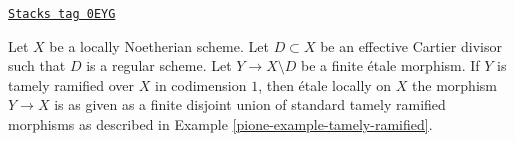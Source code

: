 \begin{lemma}

\label{pione-lemma-abhyankar-one-divisor}
\href{https://stacks.math.columbia.edu/tag/0EYG}{\texttt{Stacks tag 0EYG}}

Let $X$ be a locally Noetherian scheme. Let $D \subset X$
be an effective Cartier divisor such that $D$ is a regular scheme.
Let $Y \to X \setminus D$ be a finite \'etale morphism.
If $Y$ is tamely ramified over $X$ in codimension $1$, then
\'etale locally on $X$ the morphism $Y \to X$ is as given
as a finite disjoint union of standard tamely ramified
morphisms as described in Example \ref{pione-example-tamely-ramified}.
\end{lemma}

